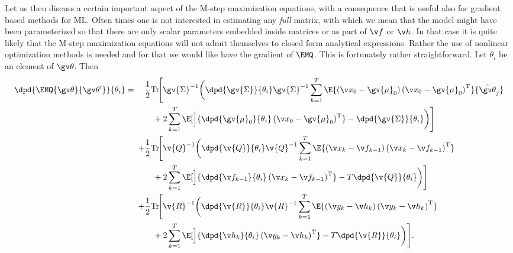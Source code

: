 Let us then discuss a certain important aspect of the M-step maximization equations, with a consequence
that is useful also for gradient based methods for ML. Often times
one is not interested in estimating any \emph{full} matrix, with which we mean that the model
might have been parameterized so that there are only scalar parameters embedded inside matrices or 
as part of $\f$ or $\h$. In that case
it is quite likely that the M-step maximization equations will not admit themselves to closed form
analytical expressions. Rather the use of nonlinear optimization methods is needed and for that
we would like have the gradient of $\EMQ$. This is fortunately rather straightforward. Let
$\theta_i$ be an element of $\Th$. Then
\begin{align}
\label{eq:dLB_nonlinear}
\begin{split}
	\dpd{\EMQ{\Th}{\Th'}}{\theta_i}
	=\quad{}&\frac{1}{2}\mathrm{Tr}\!\Bigg[\gv{\Sigma}^{-1}\bigg(
	\dpd{\gv{\Sigma}}{\theta_i}\gv{\Sigma}^{-1}
	\sum_{k=1}^T\E{\left(\x_0-\gv{\mu}_0\right)\left(\x_0-\gv{\mu}_0\right)^\tr}{\hat{\Th}_j}\\
%
	&\quad+2\sum_{k=1}^T\E[\Big]{\dpd{\gv{\mu}_0}{\theta_i}\left(\x_0-\gv{\mu}_0\right)^\tr}
	-\dpd{\gv{\Sigma}}{\theta_i}\bigg)\Bigg]\\
	+&\frac{1}{2}\mathrm{Tr}\!\Bigg[\v{Q}^{-1}\bigg(\dpd{\v{Q}}{\theta_i}\v{Q}^{-1}
	\sum_{k=1}^T\E{\left(\x_k-\f_{k-1}\right)\left(\x_k-\f_{k-1}\right)^\tr}\\
%	
	&\quad +2\sum_{k=1}^T\E[\Big]{\dpd{\f_{k-1}}{\theta_i}\left(\x_k-\f_{k-1}\right)^\tr}
	-T\dpd{\v{Q}}{\theta_i}\bigg)\Bigg]\\
	+&\frac{1}{2}\mathrm{Tr}\!\Bigg[\v{R}^{-1}\bigg(\dpd{\v{R}}{\theta_i}\v{R}^{-1}
	\sum_{k=1}^T\E{\left(\y_k-\h_{k}\right)\left(\y_k-\h_{k}\right)^\tr}\\
	&\quad +2\sum_{k=1}^T\E[\Big]{\dpd{\h_{k}}{\theta_i}\left(\y_k-\h_{k}\right)^\tr}
	-T\dpd{\v{R}}{\theta_i}\bigg)\Bigg].
\end{split}	
\end{align}

